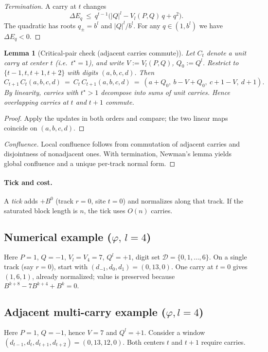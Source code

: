 \documentclass[11pt]{article}
\newtheorem{lemma}[theorem]{Lemma}
\theoremstyle{definition}
\theoremstyle{remark}
\begin{document}
\begin{proof}[Termination]
A carry at $t$ changes
\[
\Delta E_q\ \le\ q^{t-1}\big(|Q|^{l} - V_l(P,Q)\,q + q^2\big).
\]
The quadratic has roots $q_\pm=b^l$ and $|Q|^{l}/b^l$. For any $q\in(1,b^l)$ we have $\Delta E_q<0$.
\end{proof}

\begin{lemma}[Critical-pair check (adjacent carries commute)]\label{lem:commute}
Let $C_t$ denote a unit carry at center $t$ (i.e.\ $t^\star=1$), and write $V:=V_l(P,Q)$, $Q_0:=Q^l$.
Restrict to $\{t-1,t,t+1,t+2\}$ with digits $(a,b,c,d)$. Then
\[
C_{t+1}\,C_t(a,b,c,d)\ =\ C_t\,C_{t+1}(a,b,c,d)\ =\ (a+Q_0,\ b-V+Q_0,\ c+1-V,\ d+1).
\]
By linearity, carries with $t^\star>1$ decompose into sums of unit carries. Hence overlapping carries at $t$ and $t{+}1$ commute.
\end{lemma}

\begin{proof}
Apply the updates in both orders and compare; the two linear maps coincide on $(a,b,c,d)$.
\end{proof}

\begin{proof}[Confluence]
Local confluence follows from commutation of adjacent carries and disjointness of nonadjacent ones. With termination, Newman's lemma yields global confluence and a unique per-track normal form.
\end{proof}

\paragraph{Tick and cost.}
A \emph{tick} adds $+B^0$ (track $r=0$, site $t=0$) and normalizes along that track.
If the saturated block length is $n$, the tick uses $O(n)$ carries.

\subsection*{Numerical example (\texorpdfstring{$\varphi,\,l=4$}{phi, l=4})}
Here $P=1$, $Q=-1$, $V_l=V_4=7$, $Q^l=+1$, digit set $\mathcal D=\{0,1,\dots,6\}$.
On a single track (say $r=0$), start with $(d_{-1},d_0,d_1)=(0,13,0)$. One carry at $t=0$ gives $(1,6,1)$, already normalized; value is preserved because $B^{k+8}-7B^{k+4}+B^k=0$.

\subsection*{Adjacent multi-carry example (\texorpdfstring{$\varphi,l=4$}{phi, l=4})}
Here $P{=}1$, $Q{=}-1$, hence $V=7$ and $Q^l=+1$. Consider a window $(d_{t-1},d_t,d_{t+1},d_{t+2})=(0,13,12,0)$.
Both centers $t$ and $t{+}1$ require carries.
\end{document}

